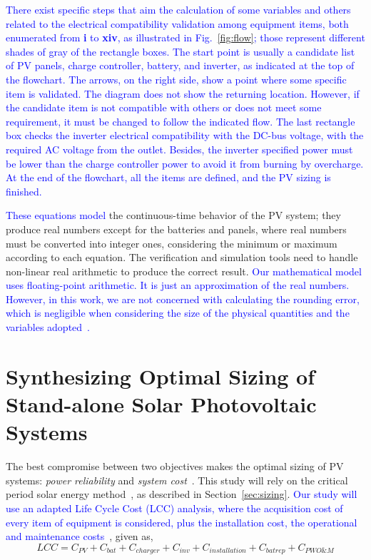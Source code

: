 \documentclass[runningheads]{llncs}
\begin{document}
\textcolor{blue}{There exist specific steps that aim the calculation of some variables and others related to the electrical compatibility validation among equipment items, both enumerated from \textbf{i} to \textbf{xiv}, as illustrated in Fig.~\ref{fig:flow}; those represent different shades of gray of the rectangle boxes. The start point is usually a candidate list of PV panels, charge controller, battery, and inverter, as indicated at the top of the flowchart. The arrows, on the right side, show a point where some specific item is validated. The diagram does not show the returning location. However, if the candidate item is not compatible with others or does not meet some requirement, it must be changed to follow the indicated flow. The last rectangle box checks the inverter electrical compatibility with the DC-bus voltage, with the required AC voltage from the outlet. Besides, the inverter specified power must be lower than the charge controller power to avoid it from burning by overcharge. At the end of the flowchart, all the items are defined, and the PV sizing is finished.}

\textcolor{blue}{These equations model} the continuous-time behavior of the PV system; they produce real numbers except for the batteries and panels, where real numbers must be converted into integer ones, considering the minimum or maximum according to each equation. The verification and simulation tools need to handle non-linear real arithmetic to produce the correct result. \textcolor{blue}{Our mathematical model uses floating-point arithmetic. It is just an approximation of the real numbers. However, in this work, we are not concerned with calculating the rounding error, which is negligible when considering the size of the physical quantities and the variables adopted~\cite{DBLP:journals/corr/abs-2004-12699}.}

\section{Synthesizing Optimal Sizing of Stand-alone Solar Photovoltaic Systems}

The best compromise between two objectives makes the optimal sizing of PV systems: \textit{power reliability} and \textit{system cost}~\cite{Alsadi2018}. This study will rely on the critical period solar energy method~\cite{Pinho}, as described in Section~\ref{sec:sizing}. \textcolor{blue}{Our study will use an adapted Life Cycle Cost (LCC) analysis, where the acquisition cost of every item of equipment is considered, plus the installation cost, the operational and maintenance costs}~\cite{Alsadi2018}, given as,
%
\begin{equation}
\label{eq:LCC}
LCC = C_{PV} + C_{bat} + C_{charger} + C_{inv} + C_{installation} + C_{batrep} + C_{PWO\&M}
\end{equation}
\end{document}
